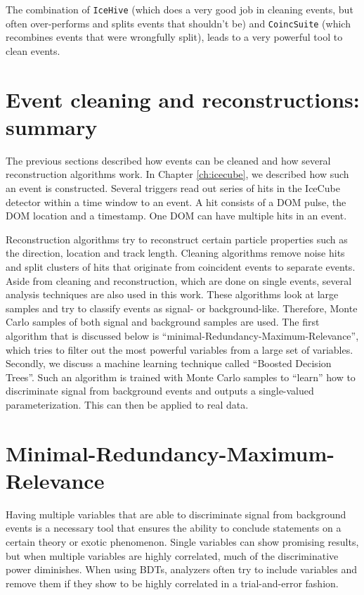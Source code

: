 \vspace{2mm}
\noindent The combination of \texttt{IceHive} (which does a very good job in cleaning events, but often over-performs and splits events that shouldn't be) and \texttt{CoincSuite} (which recombines events that were wrongfully split), leads to a very powerful tool to clean events.


\section{Event cleaning and reconstructions: summary}
The previous sections described how events can be cleaned and how several reconstruction algorithms work. In Chapter \ref{ch:icecube}, we described how such an event is constructed. Several triggers read out series of hits in the IceCube detector within a time window to an event. A hit consists of a DOM pulse, the DOM location and a timestamp. One DOM can have multiple hits in an event.

Reconstruction algorithms try to reconstruct certain particle properties such as the direction, location and track length. Cleaning algorithms remove noise hits and split clusters of hits that originate from coincident events to separate events.\\

\noindent Aside from cleaning and reconstruction, which are done on single events, several analysis techniques are also used in this work. These algorithms look at large samples and try to classify events as signal- or background-like. Therefore, Monte Carlo samples of both signal and background samples are used. The first algorithm that is discussed below is ``minimal-Redundancy-Maximum-Relevance'', which tries to filter out the most powerful variables from a large set of variables. Secondly, we discuss a machine learning technique called ``Boosted Decision Trees''. Such an algorithm is trained with Monte Carlo samples to ``learn'' how to discriminate signal from background events and outputs a single-valued parameterization. This can then be applied to real data.



\section{Minimal-Redundancy-Maximum-Relevance}
\label{sec:mrmr}
Having multiple variables that are able to discriminate signal from background events is a necessary tool that ensures the ability to conclude statements on a certain theory or exotic phenomenon. Single variables can show promising results, but when multiple variables are highly correlated, much of the discriminative power diminishes. When using BDTs, analyzers often try to include variables and remove them if they show to be highly correlated in a trial-and-error fashion.

